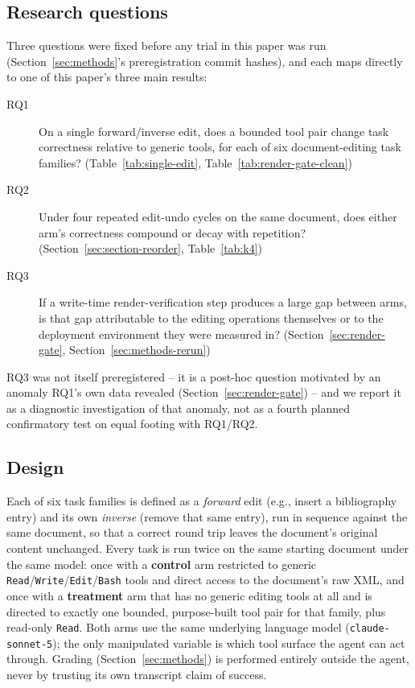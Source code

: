 \documentclass[11pt]{article}
\DeclareRobustCommand{\claim}[2]{#2}
\begin{document}
\subsection{Research questions}
\label{sec:rqs}
\claim{preregistration-status}{\claim{corpus-preregistration}{Three questions were fixed before any trial in this paper was run (Section~\ref{sec:methods}'s
preregistration commit hashes)},} and each maps directly to one of this paper's three main
results:
\begin{description}
\item[RQ1] \claim{six-task-families}{\claim{forward-inverse-chain-pass}{On a single forward/inverse edit, does a bounded tool pair change task correctness}
  relative to generic tools, for each of six document-editing task families?} (Table~\ref{tab:single-edit},
  Table~\ref{tab:render-gate-clean})
\item[RQ2] \claim{k4-design-definition}{Under four repeated edit-undo cycles on the same document, does either arm's
  correctness compound or decay with repetition?} (Section~\ref{sec:section-reorder},
  Table~\ref{tab:k4})
\item[RQ3] If a write-time render-verification step produces a large gap between arms, is
  that gap attributable to the editing operations themselves or to the deployment environment
  they were measured in? (Section~\ref{sec:render-gate}, Section~\ref{sec:methods-rerun})
\end{description}
\claim{preregistration-status}{RQ3 was not itself preregistered -- it is a post-hoc question motivated by an anomaly RQ1's own
data revealed (Section~\ref{sec:render-gate}) -- and we report it as a diagnostic investigation
of that anomaly, not as a fourth planned confirmatory test on equal footing with RQ1/RQ2.}

\subsection{Design}

\claim{forward-inverse-chain-pass}{\claim{six-task-families}{Each of six task families is defined as a \emph{forward} edit} (e.g., insert a bibliography
entry) and its own \emph{inverse} (remove that same entry), run in sequence against the same
document, so that a correct round trip leaves the document's original content unchanged.} \claim{tool-surface-only-manipulated-variable}{Every
task is run twice on the same starting document under the same model:} \claim{arm-tool-surfaces}{once with a \textbf{control}
arm restricted to generic \texttt{Read}/\texttt{Write}/\texttt{Edit}/\texttt{Bash} tools and
direct access to the document's raw XML, and once with a \textbf{treatment} arm that has no generic editing tools at all and is
directed to exactly one bounded, purpose-built tool pair for that family, plus read-only
\texttt{Read}.} \claim{tool-surface-only-manipulated-variable}{\claim{model-scope-sonnet-except-respec-haiku}{Both arms use the same underlying language model (\texttt{claude-sonnet-5});} the only
manipulated variable is which tool surface the agent can act through.} \claim{grading-external-from-docx}{Grading (Section~\ref{sec:methods})
is performed entirely outside the agent, never by trusting its own transcript claim of success.}
\end{document}
